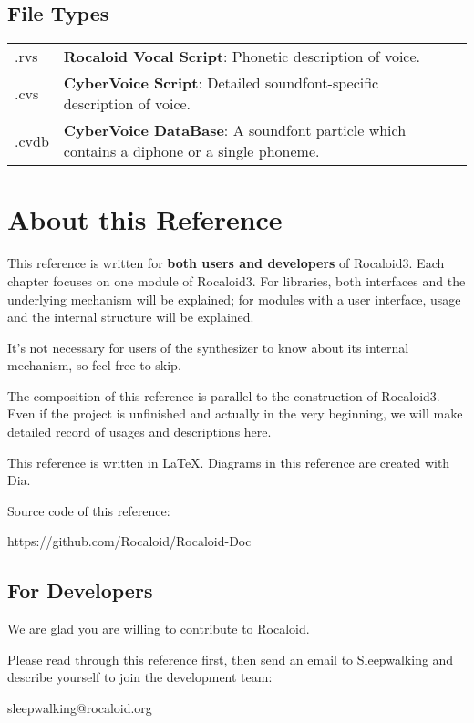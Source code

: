         \newpage

\subsection{File Types}

        \begin{tabular}{lll}
        	.rvs & \parbox{11cm}{\textbf{Rocaloid Vocal Script}: Phonetic description of voice.}\\
        	.cvs & \parbox{11cm}{\textbf{CyberVoice Script}: Detailed soundfont-specific description of voice.}\\
        	.cvdb & \parbox{11cm}{\textbf{CyberVoice DataBase}: A soundfont particle which contains a diphone or a single phoneme.}\\
        \end{tabular}

\section{About this Reference}\indent

        This reference is written for \textbf{both users and developers} of Rocaloid3. Each chapter focuses on one module of Rocaloid3. For libraries, both interfaces and the underlying mechanism will be explained; for modules with a user interface, usage and the internal structure will be explained.
        
        It's not necessary for users of the synthesizer to know about its internal mechanism, so feel free to skip.
        
        \bigskip

        The composition of this reference is parallel to the construction of Rocaloid3. Even if the project is unfinished and actually in the very beginning, we will make detailed record of usages and descriptions here.
        
        This reference is written in \LaTeX. Diagrams in this reference are created with Dia.
        
        Source code of this reference:
        
        https://github.com/Rocaloid/Rocaloid-Doc

\subsection{For Developers}\indent

        We are glad you are willing to contribute to Rocaloid.
        
        Please read through this reference first, then send an email to Sleepwalking and describe yourself to join the development team:
        
        \bigskip
        
        sleepwalking@rocaloid.org
        
        \bigskip

